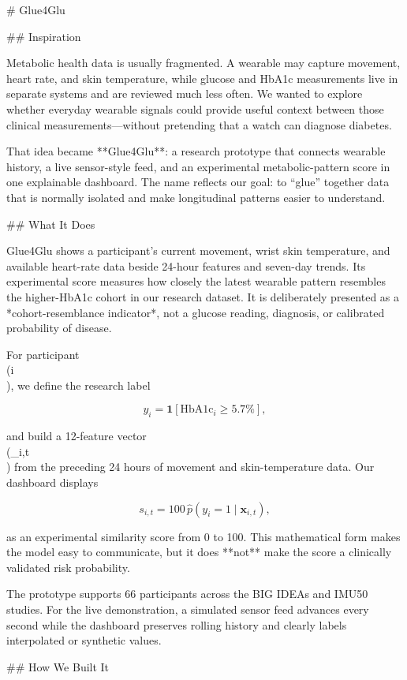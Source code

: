 # Glue4Glu

## Inspiration

Metabolic health data is usually fragmented. A wearable may capture movement,
heart rate, and skin temperature, while glucose and HbA1c measurements live in
separate systems and are reviewed much less often. We wanted to explore whether
everyday wearable signals could provide useful context between those clinical
measurements—without pretending that a watch can diagnose diabetes.

That idea became **Glue4Glu**: a research prototype that connects wearable
history, a live sensor-style feed, and an experimental metabolic-pattern score in
one explainable dashboard. The name reflects our goal: to “glue” together data
that is normally isolated and make longitudinal patterns easier to understand.

## What It Does

Glue4Glu shows a participant's current movement, wrist skin temperature, and
available heart-rate data beside 24-hour features and seven-day trends. Its
experimental score measures how closely the latest wearable pattern resembles
the higher-HbA1c cohort in our research dataset. It is deliberately presented as
a *cohort-resemblance indicator*, not a glucose reading, diagnosis, or
calibrated probability of disease.

For participant \\(i\\), we define the research label

$$
  y_i = \mathbf{1}\!\left[\mathrm{HbA1c}_i \geq 5.7\%\right],
$$

and build a 12-feature vector \\(_{i,t}\\) from the preceding 24 hours of
movement and skin-temperature data. Our dashboard displays

$$
  s_{i,t} = 100\,\widehat{p}\!\left(y_i=1\mid\mathbf{x}_{i,t}\right),
$$

as an experimental similarity score from 0 to 100. This mathematical form makes
the model easy to communicate, but it does **not** make the score a clinically
validated risk probability.

The prototype supports 66 participants across the BIG IDEAs and IMU50 studies.
For the live demonstration, a simulated sensor feed advances every second while
the dashboard preserves rolling history and clearly labels interpolated or
synthetic values.

## How We Built It

